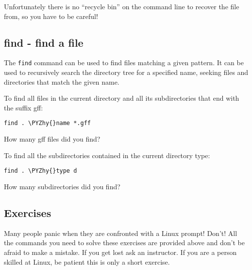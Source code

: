 \documentclass[11pt]{article}
\makeatletter
\def\PYZhy{\char`\-}
\newcommand{\boxspacing}{\kern\kvtcb@left@rule\kern\kvtcb@boxsep}
\newcommand{\prompt}[4]{
        {\ttfamily\llap{{\color{blue}\LARGE\faKeyboardO\hspace{3pt}#4}}\vspace{-\baselineskip}}
    }
\makeatother
\begin{document}
    Unfortunately there is no ``recycle bin'' on the command line to recover
the file from, so you have to be careful!

    \hypertarget{find---find-a-file}{%
\subsection{find - find a file}\label{find---find-a-file}}

The \texttt{find} command can be used to find files matching a given
pattern. It can be used to recursively search the directory tree for a
specified name, seeking files and directories that match the given name.

    To find all files in the current directory and all its subdirectories
that end with the suffix gff:

    \begin{tcolorbox}[breakable, size=fbox, boxrule=1pt, pad at break*=1mm,colback=cellbackground, colframe=cellborder]
\prompt{In}{incolor}{ }{\boxspacing}
\begin{Verbatim}[commandchars=\\\{\}]
find . \PYZhy{}name *.gff
\end{Verbatim}
\end{tcolorbox}

    How many gff files did you find?

    To find all the subdirectories contained in the current directory type:

    \begin{tcolorbox}[breakable, size=fbox, boxrule=1pt, pad at break*=1mm,colback=cellbackground, colframe=cellborder]
\prompt{In}{incolor}{ }{\boxspacing}
\begin{Verbatim}[commandchars=\\\{\}]
find . \PYZhy{}type d
\end{Verbatim}
\end{tcolorbox}

    How many subdirectories did you find?

    \hypertarget{exercises}{%
\subsection{Exercises}\label{exercises}}

Many people panic when they are confronted with a Linux prompt! Don't!
All the commands you need to solve these exercises are provided above
and don't be afraid to make a mistake. If you get lost ask an
instructor. If you are a person skilled at Linux, be patient this is
only a short exercise.
\end{document}
